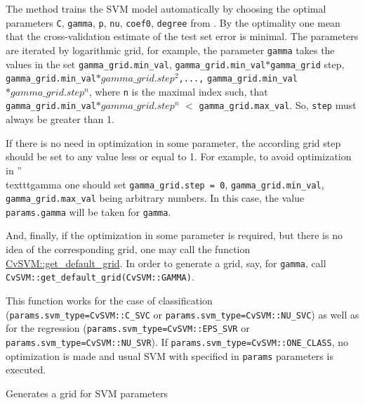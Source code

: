 \begin{description}
\end{description}

The method trains the SVM model automatically by choosing the optimal parameters \texttt{C}, \texttt{gamma}, \texttt{p}, \texttt{nu}, \texttt{coef0}, \texttt{degree} from . By the optimality one mean that the cross-validation estimate of the test set error is minimal. The parameters are iterated by logarithmic grid, for example, the parameter \texttt{gamma} takes the values in the set {\texttt{gamma\_grid.min\_val}, \texttt{gamma\_grid.min\_val$*$gamma\_grid} step, \texttt{gamma\_grid.min\_val$*gamma\_grid.step^2$,...,} \texttt{gamma\_grid.min\_val$*gamma\_grid.step^n$}}, where \texttt{n} is the maximal index such, that \texttt{gamma\_grid.min\_val$*gamma\_grid.step^n$} $<$ \texttt{gamma\_grid.max\_val}. So, \texttt{step} must always be greater than 1.

If there is no need in optimization in some parameter, the according grid step should be set to any value less or equal to 1. For example, to avoid optimization in ''\\texttt{gamma} one should set \texttt{gamma\_grid.step = 0}, \texttt{gamma\_grid.min\_val}, \texttt{gamma\_grid.max\_val} being arbitrary numbers. In this case, the value \texttt{params.gamma} will be taken for \texttt{gamma}.

And, finally, if the optimization in some parameter is required, but there is no idea of the corresponding grid, one may call the function \href{#CvSVM.3A.3Agetdefaultgrid}{CvSVM::get\_default\_grid}. In order to generate a grid, say, for \texttt{gamma}, call \texttt{CvSVM::get\_default\_grid(CvSVM::GAMMA)}.

This function works for the case of classification (\texttt{params.svm\_type=CvSVM::C\_SVC} or \texttt{params.svm\_type=CvSVM::NU\_SVC}) as well as for the regression (\texttt{params.svm\_type=CvSVM::EPS\_SVR} or \texttt{params.svm\_type=CvSVM::NU\_SVR}). If \texttt{params.svm\_type=CvSVM::ONE\_CLASS}, no optimization is made and usual SVM with specified in \texttt{params} parameters is executed.



Generates a grid for SVM parameters

